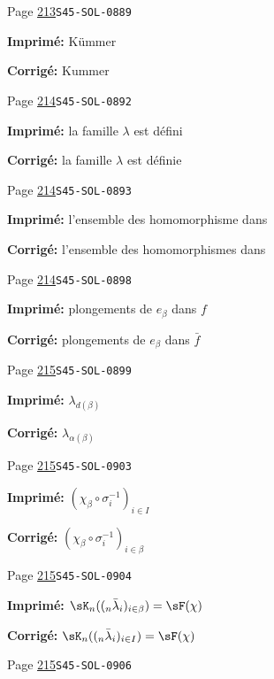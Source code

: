 \documentclass[oneside]{book}
\theoremstyle{sga-source}
\theoremstyle{sga-source-dash}
\theoremstyle{sga-source-dotdash}
\theoremstyle{sga-source-number-note-dash}
\theoremstyle{sga-source-note-number-dotdash}
\theoremstyle{sga-source-example-dotdash}
\theoremstyle{sga-source-inline-number}
\theoremstyle{sga-source-bare-number}
\theoremstyle{sga-source}
\begin{document}
\begin{description}
\smallskip
\item[\hypertarget{apparatus:FR-0219}{219}] Page \hyperlink{printpage:fr:213}{213}\quad\texttt{S45-SOL-0889}
\par\noindent\textbf{Imprimé:} K\"ummer
\par\noindent\textbf{Corrigé:} Kummer
\smallskip
\item[\hypertarget{apparatus:FR-0220}{220}] Page \hyperlink{printpage:fr:214}{214}\quad\texttt{S45-SOL-0892}
\par\noindent\textbf{Imprimé:} la famille $\lambda$ est défini
\par\noindent\textbf{Corrigé:} la famille $\lambda$ est définie
\smallskip
\item[\hypertarget{apparatus:FR-0221}{221}] Page \hyperlink{printpage:fr:214}{214}\quad\texttt{S45-SOL-0893}
\par\noindent\textbf{Imprimé:} l'ensemble des homomorphisme dans
\par\noindent\textbf{Corrigé:} l'ensemble des homomorphismes dans
\smallskip
\item[\hypertarget{apparatus:FR-0222}{222}] Page \hyperlink{printpage:fr:214}{214}\quad\texttt{S45-SOL-0898}
\par\noindent\textbf{Imprimé:} plongements de $e_\beta$ dans $f$
\par\noindent\textbf{Corrigé:} plongements de $e_\beta$ dans $\bar f$
\smallskip
\item[\hypertarget{apparatus:FR-0223}{223}] Page \hyperlink{printpage:fr:215}{215}\quad\texttt{S45-SOL-0899}
\par\noindent\textbf{Imprimé:} \(\lambda_{d(\beta)}\)
\par\noindent\textbf{Corrigé:} \(\lambda_{\alpha(\beta)}\)
\smallskip
\item[\hypertarget{apparatus:FR-0224}{224}] Page \hyperlink{printpage:fr:215}{215}\quad\texttt{S45-SOL-0903}
\par\noindent\textbf{Imprimé:} \((\chi_\beta\circ \sigma_i^{-1})_{i\in I}\)
\par\noindent\textbf{Corrigé:} \((\chi_\beta\circ \sigma_i^{-1})_{i\in\beta}\)
\smallskip
\item[\hypertarget{apparatus:FR-0225}{225}] Page \hyperlink{printpage:fr:215}{215}\quad\texttt{S45-SOL-0904}
\par\noindent\textbf{Imprimé:} \(\sK_n((_n\bar\lambda_i)_{i\in \beta}) = \sF(\chi)\)
\par\noindent\textbf{Corrigé:} \(\sK_n((_n\bar\lambda_i)_{i\in I}) = \sF(\chi)\)
\smallskip
\item[\hypertarget{apparatus:FR-0226}{226}] Page \hyperlink{printpage:fr:215}{215}\quad\texttt{S45-SOL-0906}

\end{description}
\end{document}
